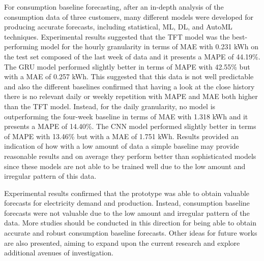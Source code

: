 For consumption baseline forecasting, after an in-depth analysis of the consumption data of three customers, many different models were developed for producing accurate forecasts, including statistical, ML, DL, and AutoML techniques.
Experimental results suggested that the TFT model was the best-performing model for the hourly granularity in terms of MAE with 0.231 kWh on the test set composed of the last week of data and it presents a MAPE of 44.19\%.
The GRU model performed slightly better in terms of MAPE with 42.55\% but with a MAE of 0.257 kWh.
This suggested that this data is not well predictable and also the different baselines confirmed that having a look at the close history there is no relevant daily or weekly repetition with MAPE and MAE both higher than the TFT model.
Instead, for the daily granularity, no model is outperforming the four-week baseline in terms of MAE with 1.318 kWh and it presents a MAPE of 14.40\%.
The CNN model performed slightly better in terms of MAPE with 13.46\% but with a MAE of 1.751 kWh.
Results provided an indication of how with a low amount of data a simple baseline may provide reasonable results and on average they perform better than sophisticated models since these models are not able to be trained well due to the low amount and irregular pattern of this data.

Experimental results confirmed that the prototype was able to obtain valuable forecasts for electricity demand and production.
Instead, consumption baseline forecasts were not valuable due to the low amount and irregular pattern of the data.
More studies should be conducted in this direction for being able to obtain accurate and robust consumption baseline forecasts.
Other ideas for future works are also presented, aiming to expand upon the current research and explore additional avenues of investigation.
